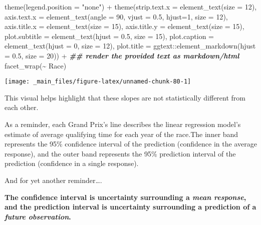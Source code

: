 \documentclass[
]{book}
\newenvironment{Shaded}{\begin{snugshade}}{\end{snugshade}}
\newcommand{\AttributeTok}[1]{\textcolor[rgb]{0.77,0.63,0.00}{#1}}
\newcommand{\DecValTok}[1]{\textcolor[rgb]{0.00,0.00,0.81}{#1}}
\newcommand{\DocumentationTok}[1]{\textcolor[rgb]{0.56,0.35,0.01}{\textbf{\textit{#1}}}}
\newcommand{\FloatTok}[1]{\textcolor[rgb]{0.00,0.00,0.81}{#1}}
\newcommand{\FunctionTok}[1]{\textcolor[rgb]{0.00,0.00,0.00}{#1}}
\newcommand{\NormalTok}[1]{#1}
\newcommand{\SpecialCharTok}[1]{\textcolor[rgb]{0.00,0.00,0.00}{#1}}
\newcommand{\StringTok}[1]{\textcolor[rgb]{0.31,0.60,0.02}{#1}}
\begin{document}
\begin{Shaded}
\begin{Highlighting}[]
  \FunctionTok{theme}\NormalTok{(}\AttributeTok{legend.position =} \StringTok{"none"}\NormalTok{) }\SpecialCharTok{+}
  \FunctionTok{theme}\NormalTok{(}\AttributeTok{strip.text.x =} \FunctionTok{element\_text}\NormalTok{(}\AttributeTok{size =} \DecValTok{12}\NormalTok{),}
        \AttributeTok{axis.text.x =} \FunctionTok{element\_text}\NormalTok{(}\AttributeTok{angle =} \DecValTok{90}\NormalTok{, }\AttributeTok{vjust =} \FloatTok{0.5}\NormalTok{, }\AttributeTok{hjust=}\DecValTok{1}\NormalTok{, }\AttributeTok{size =} \DecValTok{12}\NormalTok{),}
        \AttributeTok{axis.title.x =} \FunctionTok{element\_text}\NormalTok{(}\AttributeTok{size =} \DecValTok{15}\NormalTok{),}
        \AttributeTok{axis.title.y =} \FunctionTok{element\_text}\NormalTok{(}\AttributeTok{size =} \DecValTok{15}\NormalTok{),}
         \AttributeTok{plot.subtitle =} \FunctionTok{element\_text}\NormalTok{(}\AttributeTok{hjust =} \FloatTok{0.5}\NormalTok{, }\AttributeTok{size =} \DecValTok{15}\NormalTok{),}
         \AttributeTok{plot.caption =} \FunctionTok{element\_text}\NormalTok{(}\AttributeTok{hjust =} \DecValTok{0}\NormalTok{, }\AttributeTok{size =} \DecValTok{12}\NormalTok{),}
        \AttributeTok{plot.title =}\NormalTok{ ggtext}\SpecialCharTok{::}\FunctionTok{element\_markdown}\NormalTok{(}\AttributeTok{hjust =} \FloatTok{0.5}\NormalTok{, }\AttributeTok{size =} \DecValTok{20}\NormalTok{)) }\SpecialCharTok{+} \DocumentationTok{\#\# render the provided text as markdown/html}
  \FunctionTok{facet\_wrap}\NormalTok{(}\SpecialCharTok{\textasciitilde{}}\NormalTok{ Race)}
\end{Highlighting}
\end{Shaded}

\begin{center}\texttt{[image: \_main\_files/figure-latex/unnamed-chunk-80-1]} \end{center}

This visual helps highlight that these slopes are not statistically different from each other.

As a reminder, each Grand Prix's line describes the linear regression model's estimate of average qualifying time for each year of the race.The inner band represents the 95\% confidence interval of the prediction (confidence in the average response), and the outer band represents the 95\% prediction interval of the prediction (confidence in a single response).

And for yet another reminder\ldots.

\textbf{The confidence interval is uncertainty surrounding a \emph{mean response}, and the prediction interval is uncertainty surrounding a prediction of a \emph{future observation}.}
\end{document}
